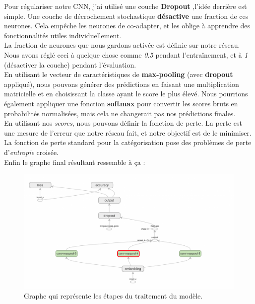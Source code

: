 Pour régulariser notre CNN, j’ai utilisé une couche \textbf{Dropout} ,l'idée derrière  est simple. Une couche de décrochement stochastique \textbf{désactive} une fraction de ces neurones. Cela empêche les neurones de co-adapter, et les oblige à apprendre des fonctionnalités utiles individuellement.\\[0.2cm]
 La fraction de neurones que nous gardons activée est définie sur notre réseau. Nous avons réglé ceci à quelque chose comme \textit{0.5} pendant l'entraînement, et à \textit{1} (désactiver la couche) pendant l'évaluation.\\[0.2cm]
 
 En utilisant le vecteur de caractéristiques de \textbf{max-pooling} (avec \textbf{dropout} appliqué), nous pouvons générer des prédictions en faisant une multiplication matricielle et en choisissant la classe ayant le score le plus élevé. Nous pourrions également appliquer une fonction \textbf{softmax} pour convertir les scores bruts en probabilités normalisées, mais cela ne changerait pas nos prédictions finales.\\[0.2cm]
 
 En utilisant nos \textit{scores}, nous pouvons définir la fonction de perte. La perte est une mesure de l'erreur que notre réseau fait, et notre objectif est de le minimiser. La fonction de perte standard pour la catégorisation pose des problèmes de perte d'\textit{entropie} croisée.\\[0.5cm]
Enfin le graphe final résultant ressemble à ça :
\begin{figure}[H]
	\begin{center}
	\includegraphics[width=\linewidth]{Images/cnn3.png}
	\end{center}
	\caption{Graphe qui représente les étapes du traitement du modèle.}
	\label{fig:rnn}
\end{figure}


